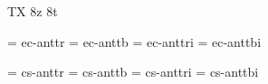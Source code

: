 
\ifx\ffdecl\undefined  \fi

 {\cond \cap \wlight} {} {TX} {8z 8t}

\def\wlight{\ffvars{l}{m}{li}{mi}\ffsetX}  
\def\nowlight{\ffvars{r}{b}{ri}{bi}\ffsetX}
\def\cond{\ffsetV{cond}{c}\ffsetX}  \def\condV{}
\def\caps{\ffsetV{cap}{cap}\ffsetX}  \def\capV{}

\ismacro{}\ifttrue

   \font\tenrm = ec-anttr  \sizespec
   \font\tenbf = ec-anttb  \sizespec
   \font\tenit = ec-anttri \sizespec
   \font\tenbi = ec-anttbi \sizespec

   \def\ffnamegen{ec-antt\condV\ffvarV\capV}

\fi

\ismacro{}\iftrue

   \font\tenrm = cs-anttr  \sizespec
   \font\tenbf = cs-anttb  \sizespec
   \font\tenit = cs-anttri \sizespec
   \font\tenbi = cs-anttbi \sizespec

   \def\ffnamegen{cs-antt\condV\ffvarV\capV}
   

\fi
\tenrm %

\def\liweight{\wlight\fam}
\def\lr{\wlight\rm}
\def\mr{\wlight\bf}
\def\li{\wlight\it}
\def\mi{\wlight\bi}

\ifx\loadmathfonts\relax \endinput \fi
\ifx\mathpreloaded X\else  \fi                     

\endinput

